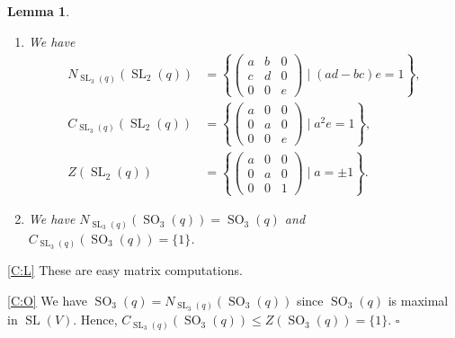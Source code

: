 \documentclass[12pt]{amsart}
\newtheorem{lemma}[theorem]{Lemma}
\theoremstyle{definition}
\newcommand{\bpf}{\noindent{\bf Proof}\hspace{7pt}}
\newcommand{\epf}{\qed}
\newcommand{\ble}{\begin{lemma}}
\newcommand{\ele}{\end{lemma}}
\DeclareMathOperator{\SL}{SL}
\DeclareMathOperator{\SO}{SO}
\renewcommand{\qed}{\hfill $\square$}
\begin{document}
\ble\label{lem:NC} 
\begin{enumerate}
\item\label{C:L} 
We have 
\begin{align*}
N_{\SL_3(q)}(\SL_2(q))&=\left\{
\begin{pmatrix} a & b  & 0 \\ 
                         c & d &  0\\
                         0 & 0 & e \end{pmatrix} \mid (ad-bc)e=1\right\},
\\
C_{\SL_3(q)}(\SL_2(q))&=\left\{
\begin{pmatrix} a & 0  & 0 \\ 
                         0 & a &  0\\
                         0 & 0 & e \end{pmatrix} \mid a^2e=1\right\},
                         \\
Z(\SL_2(q))&=\left\{
\begin{pmatrix} a & 0  & 0 \\ 
                         0 & a &  0\\
                         0 & 0 & 1 \end{pmatrix} \mid a=\pm 1\right\}.
\end{align*}
\item\label{C:O} 
We have $N_{\SL_3(q)}(\SO_3(q))=\SO_3(q)$ and 
$C_{\SL_3(q)}(\SO_3(q))=\{1\}$.
\end{enumerate}
\ele
\bpf
\eqref{C:L} These are easy matrix computations.

\eqref{C:O} We have $\SO_3(q)=N_{\SL_3(q)}(\SO_3(q))$ since $\SO_3(q)$  is maximal in $\SL(V)$.
Hence, $C_{\SL_3(q)}(\SO_3(q))\le Z(\SO_3(q))=\{1\}$.
\epf
\end{document}
